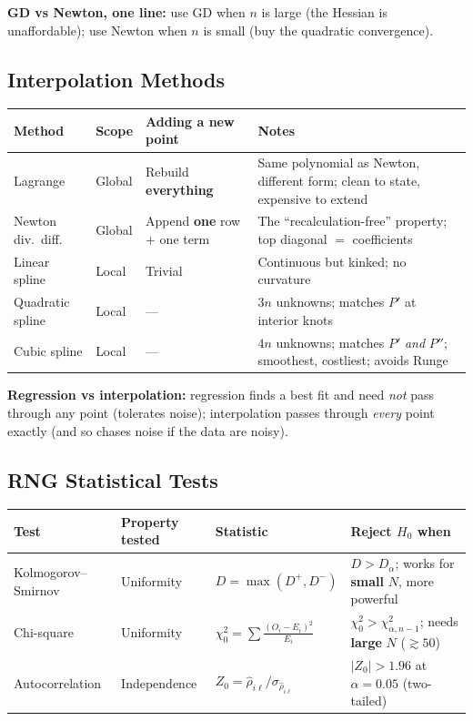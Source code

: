 \vspace{4pt}
\noindent\textbf{GD vs Newton, one line:} use GD when $n$ is large (the Hessian is unaffordable); use Newton when $n$ is small (buy the quadratic convergence).

\subsection{Interpolation Methods}

\begin{center}\small
\renewcommand{\arraystretch}{1.4}
\begin{tabular}{@{}p{}p{}p{}p{}@{}}
\toprule
\textbf{Method} & \textbf{Scope} & \textbf{Adding a new point} & \textbf{Notes} \\
\midrule
Lagrange & Global & Rebuild \textbf{everything} & Same polynomial as Newton, different form; clean to state, expensive to extend \\
Newton div.\ diff. & Global & Append \textbf{one} row $+$ one term & The ``recalculation-free'' property; top diagonal $=$ coefficients \\
Linear spline & Local & Trivial & Continuous but kinked; no curvature \\
Quadratic spline & Local & --- & $3n$ unknowns; matches $P'$ at interior knots \\
Cubic spline & Local & --- & $4n$ unknowns; matches $P'$ \emph{and} $P''$; smoothest, costliest; avoids Runge \\
\bottomrule
\end{tabular}
\end{center}

\vspace{4pt}
\noindent\textbf{Regression vs interpolation:} regression finds a best fit and need \emph{not} pass through any point (tolerates noise); interpolation passes through \emph{every} point exactly (and so chases noise if the data are noisy).

\subsection{RNG Statistical Tests}

\begin{center}\small
\renewcommand{\arraystretch}{1.4}
\begin{tabular}{@{}p{}p{}p{}p{}@{}}
\toprule
\textbf{Test} & \textbf{Property tested} & \textbf{Statistic} & \textbf{Reject $H_0$ when} \\
\midrule
Kolmogorov--Smirnov & Uniformity & $D=\max(D^+,D^-)$ & $D > D_\alpha$; works for \textbf{small} $N$, more powerful \\
Chi-square & Uniformity & $\chi_0^2=\sum\frac{(O_i-E_i)^2}{E_i}$ & $\chi_0^2>\chi^2_{\alpha,n-1}$; needs \textbf{large} $N$ ($\gtrsim50$) \\
Autocorrelation & Independence & $Z_0=\hat\rho_{i\ell}/\sigma_{\hat\rho_{i\ell}}$ & $|Z_0|>1.96$ at $\alpha=0.05$ (two-tailed) \\
\bottomrule
\end{tabular}
\end{center}

